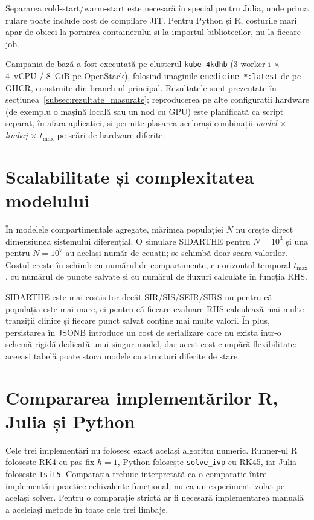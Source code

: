 Separarea cold-start/warm-start este necesară în special pentru Julia, unde prima
rulare poate include cost de compilare JIT. Pentru Python și R, costurile mari
apar de obicei la pornirea containerului și la importul bibliotecilor, nu la
fiecare job.

Campania de bază a fost executată pe clusterul \texttt{kube-4kdhb}
(3 worker-i $\times$ 4~vCPU / 8~GiB pe OpenStack), folosind imaginile
\texttt{emedicine-*:latest} de pe GHCR, construite din branch-ul principal. Rezultatele sunt prezentate în
secțiunea~\ref{subsec:rezultate_masurate}; reproducerea pe alte configurații
hardware (de exemplu o mașină locală sau un nod cu GPU) este planificată ca
script separat, în afara aplicației, și permite plasarea acelorași combinații
\emph{model$\,\times\,$limbaj$\,\times\,t_{\max}$} pe scări de hardware
diferite.

\section{Scalabilitate și complexitatea modelului}
\label{sec:scalabilitate_date}

În modelele compartimentale agregate, mărimea populației $N$ nu crește direct
dimensiunea sistemului diferențial. O simulare SIDARTHE pentru $N=10^3$ și una
pentru $N=10^7$ au același număr de ecuații; se schimbă doar scara valorilor.
Costul crește în schimb cu numărul de compartimente, cu orizontul temporal
$t_{\max}$, cu numărul de puncte salvate și cu numărul de fluxuri calculate în
funcția RHS.

SIDARTHE este mai costisitor decât SIR/SIS/SEIR/SIRS nu pentru că populația este
mai mare, ci pentru că fiecare evaluare RHS calculează mai multe tranziții
clinice și fiecare punct salvat conține mai multe valori. În plus, persistarea în
JSONB introduce un cost de serializare care nu exista într-o schemă rigidă
dedicată unui singur model, dar acest cost cumpără flexibilitate: aceeași tabelă
poate stoca modele cu structuri diferite de stare.

\section{Compararea implementărilor R, Julia și Python}
\label{sec:comparatie_timp}

Cele trei implementări nu folosesc exact același algoritm numeric. Runner-ul R
folosește RK4 cu pas fix $h=1$, Python folosește \texttt{solve\_ivp} cu RK45, iar
Julia folosește \texttt{Tsit5}. Comparația trebuie interpretată ca o comparație
între implementări practice echivalente funcțional, nu ca un experiment izolat pe
același solver. Pentru o comparație strictă ar fi necesară implementarea manuală a
aceleiași metode în toate cele trei limbaje.

